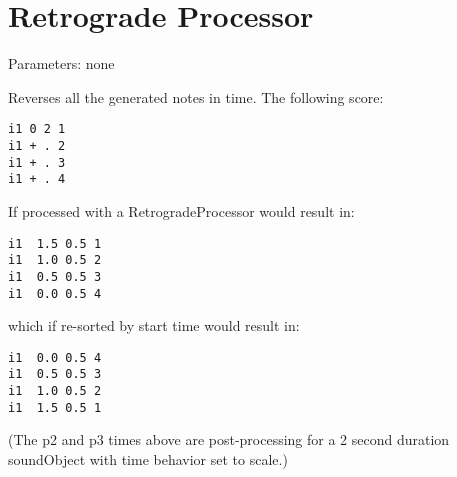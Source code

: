 \section{Retrograde Processor}\label{retrogradeProcessor}

Parameters: none

Reverses all the generated notes in time. The following score:

\begin{verbatim}
i1 0 2 1
i1 + . 2
i1 + . 3
i1 + . 4
\end{verbatim}

If processed with a RetrogradeProcessor would result in:

\begin{verbatim}
i1  1.5 0.5 1
i1  1.0 0.5 2
i1  0.5 0.5 3
i1  0.0 0.5 4
\end{verbatim}

which if re-sorted by start time would result in:

\begin{verbatim}
i1  0.0 0.5 4
i1  0.5 0.5 3
i1  1.0 0.5 2
i1  1.5 0.5 1
\end{verbatim}

(The p2 and p3 times above are post-processing for a 2 second duration
soundObject with time behavior set to scale.)
